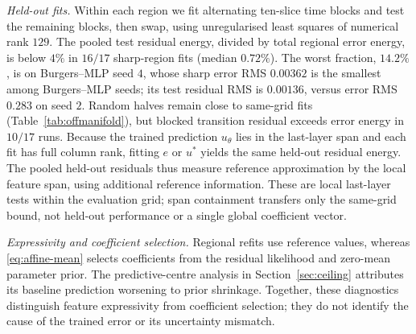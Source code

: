 \emph{Held-out fits.}
Within each region we fit alternating ten-slice time blocks and test the remaining blocks,
then swap, using unregularised least squares of numerical rank $129$. The pooled test
residual energy, divided by total regional error energy, is below $4\%$ in $16/17$
sharp-region fits (median $0.72\%$). The worst fraction, $14.2\%$, is on Burgers--MLP seed $4$,
whose sharp error RMS $0.00362$ is the smallest among Burgers--MLP seeds; its test
residual RMS is $0.00136$, versus error RMS $0.283$ on seed $2$.
Random halves remain close to same-grid fits (Table~\ref{tab:offmanifold}), but blocked
transition residual exceeds error energy in $10/17$ runs.
Because the trained prediction $u_\theta$ lies in the last-layer span and each fit has
full column rank, fitting $e$ or $u^\ast$ yields the same held-out residual energy.
The pooled held-out residuals thus measure reference approximation by the local
feature span, using additional reference information.
These are local last-layer tests within the evaluation grid; span containment transfers
only the same-grid bound, not held-out performance or a single global coefficient vector.

\emph{Expressivity and coefficient selection.}
Regional refits use reference values, whereas \eqref{eq:affine-mean} selects coefficients
from the residual likelihood and zero-mean parameter prior. The predictive-centre analysis
in Section~\ref{sec:ceiling} attributes its baseline prediction worsening to prior shrinkage.
Together, these diagnostics distinguish feature expressivity from coefficient selection;
they do not identify the cause of the trained error or its uncertainty mismatch.
